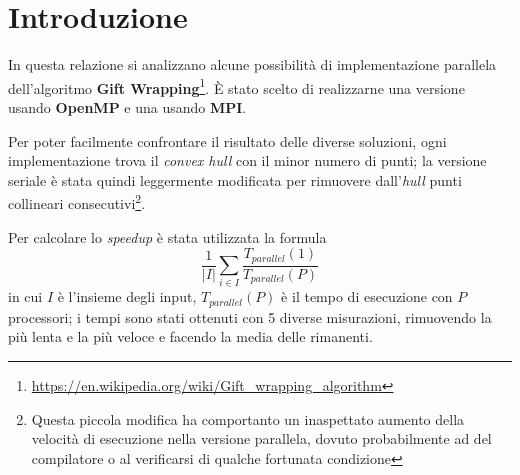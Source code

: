 \section{Introduzione}
In questa relazione si analizzano alcune possibilità di implementazione parallela dell'algoritmo \textbf{Gift Wrapping}\footnote{\url{https://en.wikipedia.org/wiki/Gift_wrapping_algorithm}}.
È stato scelto di realizzarne una versione usando \textbf{OpenMP} e una usando \textbf{MPI}.

Per poter facilmente confrontare il risultato delle diverse soluzioni, ogni implementazione trova il \emph{convex hull} con il minor numero di punti;
la versione seriale è stata quindi leggermente modificata per rimuovere dall'\emph{hull} punti collineari consecutivi\footnote{Questa piccola modifica ha comportanto un inaspettato aumento della velocità di esecuzione nella versione parallela, dovuto probabilmente ad del compilatore o al verificarsi di qualche fortunata condizione}.
 
Per calcolare lo \emph{speedup} è stata utilizzata la formula
\begin{equation}
    \frac{1}{|I|} \sum_{i \in I}{} \frac{T_{parallel}(1)}{T_{parallel}(P)}
\end{equation}
in cui $I$ è l'insieme degli input, $T_{parallel}(P)$ è il tempo di esecuzione con $P$ processori; i tempi sono stati ottenuti con 5 diverse misurazioni,
rimuovendo la più lenta e la più veloce e facendo la media delle rimanenti.
